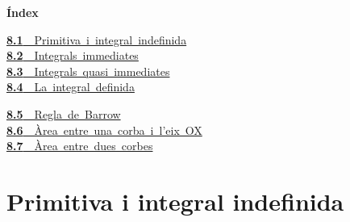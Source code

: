 \documentclass[11pt,a4paper]{article}
\begin{document}
\begin{tcolorbox}[colback=fmsurface,colframe=fmsurface,arc=3mm,left=4mm,right=4mm,top=2mm,bottom=2mm]
\small\textbf{Índex}\par\smallskip
\begin{minipage}[t]{0.49\linewidth}\small \mbox{\hyperlink{sec1}{\textbf{\color{fmgreen}8.1}\ \ Primitiva i integral indefinida}}\\[3pt]
\mbox{\hyperlink{sec2}{\textbf{\color{fmgreen}8.2}\ \ Integrals immediates}}\\[3pt]
\mbox{\hyperlink{sec3}{\textbf{\color{fmgreen}8.3}\ \ Integrals quasi immediates}}\\[3pt]
\mbox{\hyperlink{sec4}{\textbf{\color{fmgreen}8.4}\ \ La integral definida}}\\[3pt]\end{minipage}\hfill\begin{minipage}[t]{0.49\linewidth}\small \mbox{\hyperlink{sec5}{\textbf{\color{fmgreen}8.5}\ \ Regla de Barrow}}\\[3pt]
\mbox{\hyperlink{sec6}{\textbf{\color{fmgreen}8.6}\ \ Àrea entre una corba i l'eix OX}}\\[3pt]
\mbox{\hyperlink{sec7}{\textbf{\color{fmgreen}8.7}\ \ Àrea entre dues corbes}}\\[3pt]\end{minipage}
\end{tcolorbox}

\section{Primitiva i integral indefinida}\hypertarget{sec1}{}

  
\end{document}
